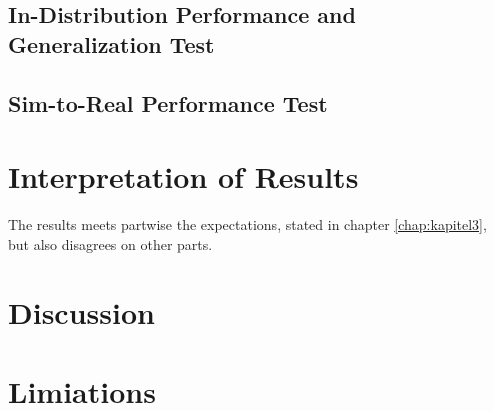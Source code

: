 		\subsection{In-Distribution Performance and Generalization Test}
		
		\subsection{Sim-to-Real Performance Test}



	\section{Interpretation of Results}
	\label{sec:interpretation-of-results}
		The results meets partwise the expectations, stated in chapter \ref{chap:kapitel3}, but also disagrees on other parts.
	
	
	
	
	
	\section{Discussion} %
	\label{sec:discussion}
	
	
	
	
	\section{Limiations} %
	\label{sec:limitations}
	
	\iffalse
	Diskussion - Bias Experiment: In the bias experiment it is difficult to say if a prediction is biased towards texture or shape. All confusing data is only confusing on texture level, so a texture biased model should perform poorly in comparison to a shape biased model. But also a shape biased model will use texture information and the question is how much and how the impact really is. In addition there are other influences, like amount of objects per scene, brightness, reflective texture, novel texture, novel shape and all of these can influence the result. -> my opinion? what does the results look like?
	It seems like that there are learned shape and texture dependent decisions
	\fi
	
	
	








